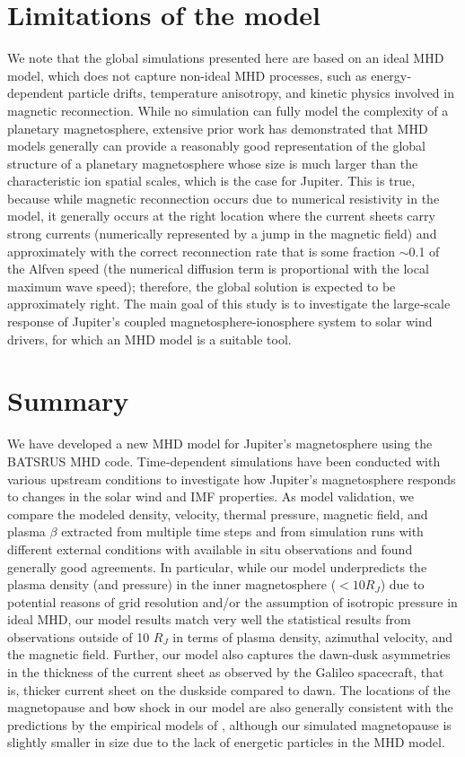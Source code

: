 \section{Limitations of the model}
We note that the global simulations presented here are based on an ideal MHD model, which does not capture non-ideal MHD processes, such as energy‐dependent particle drifts, temperature anisotropy, and kinetic physics involved in magnetic reconnection. While no simulation can fully model the complexity of a planetary magnetosphere, extensive prior work has demonstrated that MHD models generally can provide a reasonably good representation of the global structure of a planetary magnetosphere whose size is much larger than the characteristic ion spatial scales, which is the case for Jupiter. This is true, because while magnetic reconnection occurs due to numerical resistivity in the model, it generally occurs at the right location where the current sheets carry strong currents (numerically represented by a jump in the magnetic field) and approximately with the correct reconnection rate that is some fraction $\sim$0.1 of the Alfven speed (the numerical diffusion term is proportional with the local maximum wave speed); therefore, the global solution is expected to be approximately right. The main goal of this study is to investigate the large‐scale response of Jupiter's coupled magnetosphere‐ionosphere system to solar wind drivers, for which an MHD model is a suitable tool.

\section{Summary}
We have developed a new MHD model for Jupiter's magnetosphere using the BATSRUS MHD code. Time‐dependent simulations have been conducted with various upstream conditions to investigate how Jupiter's magnetosphere responds to changes in the solar wind and IMF properties. As model validation, we compare the modeled density, velocity, thermal pressure, magnetic field, and plasma $\beta$ extracted from multiple time steps and from simulation runs with different external conditions with available in situ observations and found generally good agreements. In particular, while our model underpredicts the plasma density (and pressure) in the inner magnetosphere ($<10 R_J$) due to potential reasons of grid resolution and/or the assumption of isotropic pressure in ideal MHD, our model results match very well the statistical results from observations outside of 10 $R_J$ in terms of plasma density, azimuthal velocity, and the magnetic field. Further, our model also captures the dawn‐dusk asymmetries in the thickness of the current sheet \cite{Khurana2005,Vogt2011a} as observed by the Galileo spacecraft, that is, thicker current sheet on the duskside compared to dawn. The locations of the magnetopause and bow shock in our model are also generally consistent with the predictions by the empirical models of \cite{Joy2002a}, although our simulated magnetopause is slightly smaller in size due to the lack of energetic particles in the MHD model. 
